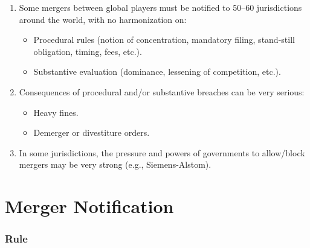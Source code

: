             \begin{enumerate}
                \item Some mergers between global players must be notified to 50–60 jurisdictions around the world, with no harmonization on:
                \begin{itemize}
                    \item Procedural rules (notion of concentration, mandatory filing, stand-still obligation, timing, fees, etc.).
                    \item Substantive evaluation (dominance, lessening of competition, etc.).
                \end{itemize}
                \item Consequences of procedural and/or substantive breaches can be very serious:
                \begin{itemize}
                    \item Heavy fines.
                    \item Demerger or divestiture orders.
                \end{itemize}
                \item In some jurisdictions, the pressure and powers of governments to allow/block mergers may be very strong (e.g., Siemens-Alstom).
            \end{enumerate}

\newpage
\section{Merger Notification}

    \noindent
    \subsubsection*{Rule}
    
